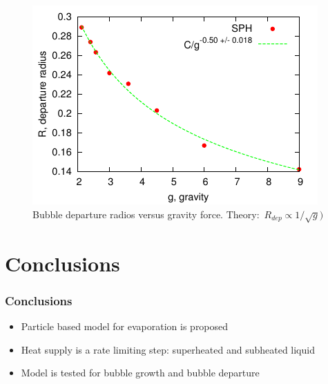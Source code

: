 \documentclass{beamer}
\begin{document}
\begin{frame}
  \begin{figure}[t]
    \centering
    \includegraphics{gnuplot/dep.pdf}
    \caption{Bubble departure radios versus gravity
      force. Theory:~$R_{dep} \propto 1/\sqrt{g})$ }
    \label{fig:radii}
  \end{figure}
  
\end{frame}

\section{Conclusions}
\begin{frame}
  \frametitle{Conclusions}
  \begin{itemize}
  \item Particle based model for evaporation is proposed
  \item Heat supply is a rate limiting step: superheated and subheated
    liquid
  \item Model is tested for bubble growth and bubble departure
  \end{itemize}
\end{frame}
\end{document}
